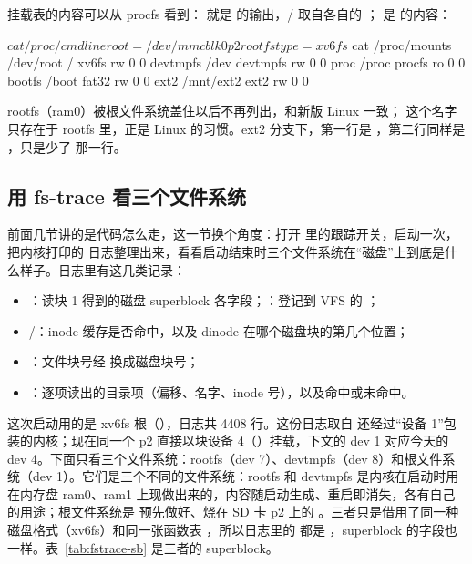 挂载表的内容可以从 procfs 看到： 就是  的输出，/ 取自各自的 ； 是  的内容：

\begin{txtcode}
$ cat /proc/cmdline
root=/dev/mmcblk0p2 rootfstype=xv6fs
$ cat /proc/mounts
/dev/root / xv6fs rw 0 0
devtmpfs /dev devtmpfs rw 0 0
proc /proc procfs ro 0 0
bootfs /boot fat32 rw 0 0
ext2 /mnt/ext2 ext2 rw 0 0
\end{txtcode}

rootfs（ram0）被根文件系统盖住以后不再列出，和新版 Linux 一致； 这个名字只存在于 rootfs 里，正是 Linux 的习惯。ext2 分支下，第一行是 ，第二行同样是 ，只是少了  那一行。

\subsection{用 fs-trace 看三个文件系统}
\label{sec:fs-trace}

前面几节讲的是代码怎么走，这一节换个角度：打开  里的跟踪开关，启动一次，把内核打印的  日志整理出来，看看启动结束时三个文件系统在“磁盘”上到底是什么样子。日志里有这几类记录：

\begin{itemize}
  \item {}：读块 1 得到的磁盘 superblock 各字段；：登记到 VFS 的 ；
  \item {}/：inode 缓存是否命中，以及 dinode 在哪个磁盘块的第几个位置；
  \item {}：文件块号经  换成磁盘块号；
  \item {}：逐项读出的目录项（偏移、名字、inode 号），以及命中或未命中。
\end{itemize}

这次启动用的是 xv6fs 根（），日志共 4408 行。这份日志取自  还经过“设备 1”包装的内核；现在同一个 p2 直接以块设备 4（）挂载，下文的 dev 1 对应今天的 dev 4。下面只看三个文件系统：rootfs（dev 7）、devtmpfs（dev 8）和根文件系统（dev 1）。它们是三个不同的文件系统：rootfs 和 devtmpfs 是内核在启动时用  在内存盘 ram0、ram1 上现做出来的，内容随启动生成、重启即消失，各有自己的用途；根文件系统是  预先做好、烧在 SD 卡 p2 上的 。三者只是借用了同一种磁盘格式（xv6fs）和同一张函数表 ，所以日志里的  都是 ，superblock 的字段也一样。表~\ref{tab:fstrace-sb} 是三者的 superblock。

